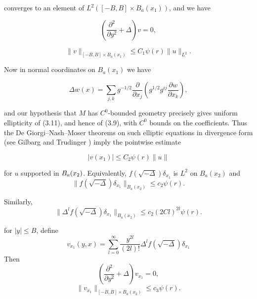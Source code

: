 converges to an element of $L^2([-B,B]\times B_a(x_1))$, and we have

\begin{equation}\tag{3.9}
\left(\frac{\partial^2}{\partial y^2}+\Delta\right)v=0,
\end{equation}

\begin{equation}\tag{3.10}
\|v\|_{[-B,B]\times B_a(x_1)}\le C_1\psi(r)\|u\|_{L^2}.
\end{equation}

Now in normal coordinates on $B_a(x_1)$ we have

\begin{equation}\tag{3.11}
\Delta w(x)=\sum_{j,k} g^{-1/2}\frac{\partial}{\partial x_j}
\left(g^{1/2}g^{ij}\frac{\partial w}{\partial x_k}\right),
\end{equation}

and our hypothesis that $M$ has $C^0$-bounded geometry precisely gives uniform ellipticity of (3.11), and hence of (3.9), with $C^0$ bounds on the coefficients. Thus the De Giorgi--Nash--Moser theorems on such elliptic equations in divergence form (see Gilbarg and Trudinger \cite{cgt-gilbarg-trudinger}) imply the pointwise estimate

\begin{equation}\tag{3.12}
|v(x_1)|\le C_2\psi(r)\|u\|
\end{equation}

for $u$ supported in $B_a(x_2)$. Equivalently,
$f(\sqrt{-\Delta})\delta_{x_1}$ is $L^2$ on $B_a(x_2)$ and
\begin{equation}\tag{3.13}
 \bigl\|f(\sqrt{-\Delta})\delta_{x_1}\bigr\|_{B_a(x_2)}\le c_2\psi(r).
\end{equation}

Similarly,
\begin{equation}\tag{3.14}
 \bigl\|\Delta^l f(\sqrt{-\Delta})\delta_{x_1}\bigr\|_{B_a(x_2)}\le c_2(2Cl)^{2l}\psi(r).
\end{equation}

for $|y|\le B$, define
\begin{equation}\tag{3.15}
 v_{x_1}(y,x)=\sum_{l=0}^{\infty}\frac{y^{2l}}{(2l)!}\Delta^l f(\sqrt{-\Delta})\delta_{x_1}
\end{equation}
Then
\begin{equation}\tag{3.16}
 \left(\frac{\partial^2}{\partial y^2}+\Delta\right)v_{x_1}=0,
\end{equation}
\begin{equation}\tag{3.17}
 \bigl\|v_{x_1}\bigr\|_{[-B,B]\times B_a(x_2)}\le c_3\psi(r).
\end{equation}


